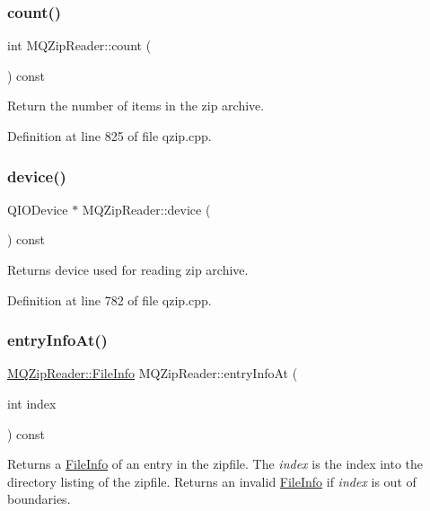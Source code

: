 \subsubsection{\texorpdfstring{count()}{count()}}
{\footnotesize\ttfamily int M\+Q\+Zip\+Reader\+::count (\begin{DoxyParamCaption}{ }\end{DoxyParamCaption}) const}

Return the number of items in the zip archive. 

Definition at line 825 of file qzip.\+cpp.

\mbox{\label{class_m_q_zip_reader_aff10cccb86592a1d9c228195996fdd11}} 
\subsubsection{\texorpdfstring{device()}{device()}}
{\footnotesize\ttfamily Q\+I\+O\+Device $\ast$ M\+Q\+Zip\+Reader\+::device (\begin{DoxyParamCaption}{ }\end{DoxyParamCaption}) const}

Returns device used for reading zip archive. 

Definition at line 782 of file qzip.\+cpp.

\mbox{\label{class_m_q_zip_reader_a93ce1fd5d0d56e582b882a1335d43449}} 
\subsubsection{\texorpdfstring{entry\+Info\+At()}{entryInfoAt()}}
{\footnotesize\ttfamily \hyperlink{struct_m_q_zip_reader_1_1_file_info}{M\+Q\+Zip\+Reader\+::\+File\+Info} M\+Q\+Zip\+Reader\+::entry\+Info\+At (\begin{DoxyParamCaption}\item[{int}]{index }\end{DoxyParamCaption}) const}

Returns a \hyperlink{struct_m_q_zip_reader_1_1_file_info}{File\+Info} of an entry in the zipfile. The {\itshape index} is the index into the directory listing of the zipfile. Returns an invalid \hyperlink{struct_m_q_zip_reader_1_1_file_info}{File\+Info} if {\itshape index} is out of boundaries.

